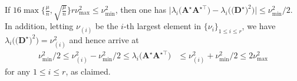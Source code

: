 %
If $16\max\{ \frac{\mu}{n}, \sqrt{\frac{\mu}{n}} \big\} r\nu_{\max}^{2}\leq \nu_{\min}^{2}$, then one has $\big|\lambda_{i}\big(\bm{A}^{\star}\bm{A}^{\star\top}\big)-\lambda_{i}\big(\big(\bm{D}^{\star}\big)^{2}\big)\big| \leq  \nu_{\min}^{2}/2$. In addition, letting $\nu_{(i)}$ be the $i$-th largest element in $\{\nu_i\}_{1\leq i\leq r}$, we have $\lambda_{i}\big( \big(\bm{D}^{\star}\big)^{2} \big) = \nu_{(i)}^2$ and hence arrive at
%
\begin{align*}
	\nu_{\min}^{2} / 2 \leq \nu_{(i)}^2  -  \nu_{\min}^{2} / 2 \leq
	\lambda_{i}\big(\bm{A}^{\star}\bm{A}^{\star\top}\big) & \leq  \nu_{(i)}^2  +  \nu_{\min}^{2} / 2 \leq 2 \nu_{\max}^{2}
\end{align*}
%
for any $1\leq i\leq r$, as claimed.


